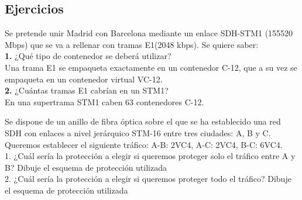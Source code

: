 \subsection{Ejercicios}
\begin{exercise}[1]
	Se pretende unir Madrid con Barcelona mediante un enlace SDH-STM1 (155520 Mbps) que se va a rellenar con tramas E1(2048 kbps). Se quiere saber:\\
	\textbf{1.} ¿Qué tipo de contenedor se deberá utilizar?\\
	Una trama E1 se empaqueta exactamente en un contenedor C-12, que a su vez se empaqueta en un contenedor virtual VC-12.\\
	\textbf{2.} ¿Cuántas tramas E1 cabrían en un STM1?\\
	En una supertrama STM1 caben 63 contenedores C-12.
\end{exercise}
\begin{exercise}[2]
	Se dispone de un anillo de fibra óptica sobre el que se ha establecido una red SDH con enlaces a nivel jerárquico STM-16 entre tres ciudades: A, B y C. Queremos establecer el siguiente tráfico: A-B: 2VC4, A-C: 2VC4, B-C: 6VC4.\\
	1. ¿Cuál sería la protección a elegir si queremos proteger solo el tráfico entre A y B? Dibuje el esquema de protección utilizada\\
	2. ¿Cuál sería la protección a elegir si queremos proteger todo el tráfico? Dibuje el esquema de protección utilizada\\
\end{exercise}
